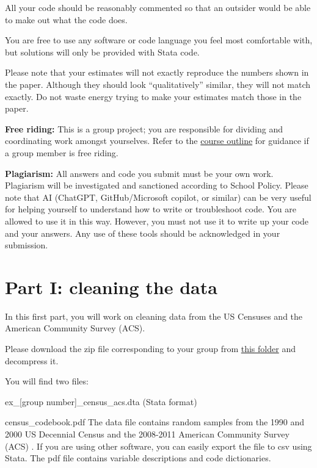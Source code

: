 \documentclass[a4paper, 11pt,addpoints]{exam}
\begin{document}
\item All your code should be reasonably commented so that an outsider would be able to make out what the code does.
\item You are free to use any software or code language you feel most comfortable with, but solutions will only be provided with Stata code.
\item Please note that your estimates will not exactly reproduce the numbers shown in the paper. Although they should look ``qualitatively'' similar, they will not match exactly. Do not waste energy trying to make your estimates match those in the paper.
\item \textbf{Free riding:} This is a group project; you are responsible for dividing and coordinating work amongst yourselves. Refer to the \href{https://www.learn.ed.ac.uk/ultra/courses/_121272_1/outline/edit/document/_10205264_1?courseId=_121272_1&view=content}{course outline} for guidance if a group member is free riding.
\item \textbf{Plagiarism:} All answers and code you submit must be your own work. Plagiarism will be investigated and sanctioned according to School Policy. Please note that AI (ChatGPT, GitHub/Microsoft copilot, or similar) can be very useful for helping yourself to understand how to write or troubleshoot code. You are allowed to use it in this way. However, you must not use it to write up your code and your answers. Any use of these tools should be acknowledged in your submission.
\eitem 
\newpage 
\section*{Part I: cleaning the data}
\noindent In this first part, you will work on cleaning data from the US Censuses and the American Community Survey (ACS).
\bitem
	\item Please download the zip file corresponding to your group from \href{https://www.dropbox.com/scl/fo/g2xtn0yymiebz0wivfe7k/AGwxkhhcV-4sBT43u8ZHYL4?rlkey=a8g768pa9m9v067bg9pudg10h&dl=0}{this folder} and decompress it.
	\item You will find two files:
	\bitem 
		\item ex\_[group number]\_census\_acs.dta (Stata format)
		\item census\_codebook.pdf
	\eitem 
	The data file contains random samples from the 1990 and 2000 US Decennial Census and the 2008-2011 American Community Survey (ACS) \citep{IPUMS}. If you are using other software, you can easily export the file to csv using Stata. The pdf file contains variable descriptions and code dictionaries.
	
\end{document}
